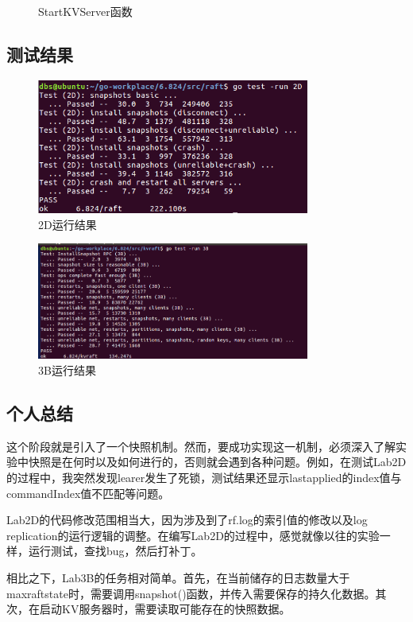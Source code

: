 \documentclass[]{article}
\begin{document}
\begin{itemize}
\begin{figure}[H]
			\caption{StartKVServer函数}
		\end{figure}
	\end{itemize}

	\subsection{测试结果}
	\begin{figure}[H]
		\centering
		\includegraphics[width=0.8\textwidth]{./2D/2D result.png}
		\caption{2D运行结果}
	\end{figure}
	\begin{figure}[H]
		\centering
		\includegraphics[width=0.8\textwidth]{./3B/3B result.png}
		\caption{3B运行结果}
	\end{figure}
	\subsection{个人总结}
	这个阶段就是引入了一个快照机制。然而，要成功实现这一机制，必须深入了解实验中快照是在何时以及如何进行的，否则就会遇到各种问题。例如，在测试Lab2D的过程中，我突然发现learer发生了死锁，测试结果还显示lastapplied的index值与commandIndex值不匹配等问题。
	
	Lab2D的代码修改范围相当大，因为涉及到了rf.log的索引值的修改以及log replication的运行逻辑的调整。在编写Lab2D的过程中，感觉就像以往的实验一样，运行测试，查找bug，然后打补丁。
	
	相比之下，Lab3B的任务相对简单。首先，在当前储存的日志数量大于maxraftstate时，需要调用snapshot()函数，并传入需要保存的持久化数据。其次，在启动KV服务器时，需要读取可能存在的快照数据。
	
\end{document}
